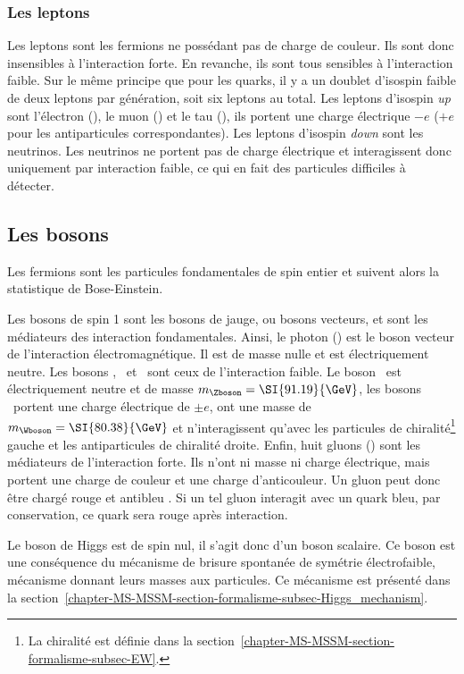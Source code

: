 \subsubsection{Les leptons}\label{chapter-MS-MSSM-section-SM_ptcs-subsec-fermions-subsubsec-leptons}
Les leptons sont les fermions ne possédant pas de charge de couleur. Ils sont donc insensibles à l'interaction forte. En revanche, ils sont tous sensibles à l'interaction faible.
Sur le même principe que pour les quarks, il y a un doublet d'isospin faible de deux leptons par génération, soit six leptons au total.
Les leptons d'isospin \emph{up} sont l'électron (\electron), le muon (\muon) et le tau (\leptau), ils portent une charge électrique $-e$ ($+e$ pour les antiparticules correspondantes). Les leptons d'isospin \emph{down} sont les neutrinos. Les neutrinos ne portent pas de charge électrique et interagissent donc uniquement par interaction faible, ce qui en fait des particules difficiles à détecter.


\subsection{Les bosons}\label{chapter-MS-MSSM-section-SM_ptcs-subsec-bosons}
Les fermions sont les particules fondamentales de spin entier et suivent alors la statistique de Bose-Einstein.
\par Les bosons de spin 1 sont les bosons de jauge, ou bosons vecteurs, et sont les médiateurs des interaction fondamentales.
Ainsi, le photon (\photon) est le boson vecteur de l'interaction électromagnétique. Il est de masse nulle et est électriquement neutre.
Les bosons \Wbosonplus, \Wbosonminus\ et \Zboson\ sont ceux de l'interaction faible. Le boson \Zboson\ est électriquement neutre et de masse $m_\Zboson=\SI{91.19}{\GeV}$, les bosons \Wboson\ portent une charge électrique de $\pm e$, ont une masse de $m_\Wboson=\SI{80.38}{\GeV}$ et n'interagissent qu'avec les particules de chiralité\footnote{La chiralité est définie dans la section~\ref{chapter-MS-MSSM-section-formalisme-subsec-EW}.} gauche et les antiparticules de chiralité droite.
Enfin, huit gluons (\gluon) sont les médiateurs de l'interaction forte. Ils n'ont ni masse ni charge électrique, mais portent une charge de couleur et une charge d'anticouleur. Un gluon peut donc être chargé \og rouge et antibleu \fg{}. Si un tel gluon interagit avec un quark bleu, par conservation, ce quark sera rouge après interaction.
\par Le boson de Higgs est de spin nul, il s'agit donc d'un boson scalaire. Ce boson est une conséquence du mécanisme de brisure spontanée de symétrie électrofaible, mécanisme donnant leurs masses aux particules. Ce mécanisme est présenté dans la section~\ref{chapter-MS-MSSM-section-formalisme-subsec-Higgs_mechanism}.

%
%
